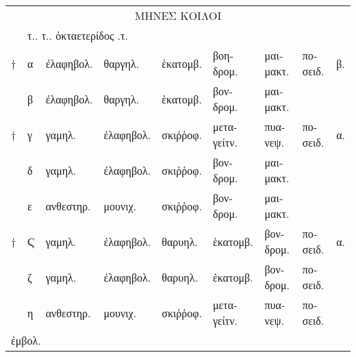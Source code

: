 \begin{tabular}{ll|lllllll}
\multicolumn{9}{c}{\large{\textgreek{ΜΗΝΕΣ ΚΟΙΛΟΙ}}}
\\
~ & \multicolumn{5}{l}{\textgreek{τ.. τ.. ὀκταετερίδος .τ.}}
\\
\hline
\scriptsize{†} &
\textgreek{α} &
\textgreek{ἐλαφηβολ.} &
\textgreek{θαργηλ.} &
\textgreek{ἑκατομβ.} &
\textgreek{βοηδρομ.} &
\textgreek{μαιμακτ.} &
\textgreek{ποσειδ.} &
\textgreek{β.}
\\
 &
\textgreek{β} &
\textgreek{ἐλαφηβολ.} &
\textgreek{θαργηλ.} &
\textgreek{ἑκατομβ.} &
\textgreek{βονδρομ.} &
\textgreek{μαιμακτ.} &
 &

\\
\scriptsize{†} &
\textgreek{γ} &
\textgreek{γαμηλ.} &
\textgreek{ἐλαφηβολ.} &
\textgreek{σκιῤῥοφ.} &
\textgreek{μεταγείτν.} &
\textgreek{πυανεψ.} &
\textgreek{ποσειδ.} &
\textgreek{α.}
\\
\hline
 &
\textgreek{δ} &
\textgreek{γαμηλ.} &
\textgreek{ἐλαφηβολ.} &
\textgreek{σκιῤῥοφ.} &
\textgreek{βονδρομ.} &
\textgreek{μαιμακτ.} &
 &

\\
 &
\textgreek{ε} &
\textgreek{ανθεστηρ.} &
\textgreek{μουνιχ.} &
\textgreek{σκιῤῥοφ.} &
\textgreek{βονδρομ.} &
\textgreek{μαιμακτ.} &
 &

\\
\scriptsize{†} &
\textgreek{Ϛ} &
\textgreek{γαμηλ.} &
\textgreek{ἐλαφηβολ.} &
\textgreek{θαρυηλ.} &
\textgreek{ἑκατομβ.} &
\textgreek{βονδρομ.} &
\textgreek{ποσειδ.} &
\textgreek{α.}
\\
\hline
 &
\textgreek{ζ} &
\textgreek{γαμηλ.} &
\textgreek{ἐλαφηβολ.} &
\textgreek{θαρυηλ.} &
\textgreek{ἑκατομβ.} &
\textgreek{βονδρομ.} &
\textgreek{ποσειδ.} &

\\
 &
\textgreek{η} &
\textgreek{ανθεστηρ.} &
\textgreek{μουνιχ.} &
\textgreek{σκιῤῥοφ.} &
\textgreek{μεταγείτν.} &
\textgreek{πυανεψ.} &
\textgreek{ποσειδ.} &

\\
\hline
\multicolumn{5}{l}{\footnotesize \super{†} \textgreek{ἐμβολ.}}\\
\end{tabular}
%
